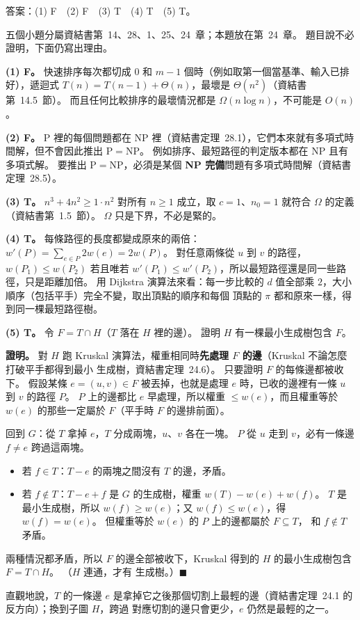 \begin{pastsoln}
答案：(1) F　(2) F　(3) T　(4) T　(5) T。

五個小題分屬資結書第~14、28、1、25、24~章；本題放在第~24~章。 題目說不必證明，下面仍寫出理由。

\textbf{(1) F。} 快速排序每次都切成 $0$ 和 $m - 1$ 個時（例如取第一個當基準、輸入已排好），遞迴式
$T(n) = T(n-1) + \Theta(n)$，最壞是 $\Theta(n^2)$（資結書第~14.5~節）。 而且任何比較排序的最壞情況都是
$\Omega(n \log n)$，不可能是 $O(n)$。

\textbf{(2) F。} P 裡的每個問題都在 NP 裡（資結書定理~28.1），它們本來就有多項式時間解，但不會因此推出
$\mathrm{P} = \mathrm{NP}$。 例如排序、最短路徑的判定版本都在 NP 且有多項式解。 要推出 $\mathrm{P} =
\mathrm{NP}$，必須是某個 \textbf{NP 完備}問題有多項式時間解（資結書定理~28.5）。

\textbf{(3) T。} $n^3 + 4n^2 \ge 1 \cdot n^2$ 對所有 $n \ge 1$ 成立，取 $c = 1$、$n_0 = 1$ 就符合 $\Omega$ 的定義
（資結書第~1.5~節）。 $\Omega$ 只是下界，不必是緊的。

\textbf{(4) T。} 每條路徑的長度都變成原來的兩倍：$w'(P) = \sum_{e \in P} 2w(e) = 2w(P)$。 對任意兩條從 $u$ 到 $v$
的路徑，$w(P_1) \le w(P_2)$ 若且唯若 $w'(P_1) \le w'(P_2)$，所以最短路徑還是同一些路徑，只是距離加倍。 用
Dijkstra 演算法來看：每一步比較的 $d$ 值全部乘 $2$，大小順序（包括平手）完全不變，取出頂點的順序和每個
頂點的 $\pi$ 都和原來一樣，得到同一棵最短路徑樹。

\textbf{(5) T。} 令 $F = T \cap H$（$T$ 落在 $H$ 裡的邊）。 證明 $H$ 有一棵最小生成樹包含 $F$。

\textbf{證明。} 對 $H$ 跑 Kruskal 演算法，權重相同時\textbf{先處理 $F$ 的邊}（Kruskal 不論怎麼打破平手都得到最小
生成樹，資結書定理~24.6）。 只要證明 $F$ 的每條邊都被收下。 假設某條 $e = (u, v) \in F$ 被丟掉，也就是處理 $e$
時，已收的邊裡有一條 $u$ 到 $v$ 的路徑 $P$。 $P$ 上的邊都比 $e$ 早處理，所以權重 $\le w(e)$，而且權重等於
$w(e)$ 的那些一定屬於 $F$（平手時 $F$ 的邊排前面）。

回到 $G$：從 $T$ 拿掉 $e$，$T$ 分成兩塊，$u$、$v$ 各在一塊。 $P$ 從 $u$ 走到 $v$，必有一條邊 $f \ne e$ 跨過這兩塊。
\begin{itemize}
\item 若 $f \in T$：$T - e$ 的兩塊之間沒有 $T$ 的邊，矛盾。
\item 若 $f \notin T$：$T - e + f$ 是 $G$ 的生成樹，權重 $w(T) - w(e) + w(f)$。 $T$ 是最小生成樹，所以
$w(f) \ge w(e)$；又 $w(f) \le w(e)$，得 $w(f) = w(e)$。 但權重等於 $w(e)$ 的 $P$ 上的邊都屬於 $F \subseteq T$，
和 $f \notin T$ 矛盾。
\end{itemize}
兩種情況都矛盾，所以 $F$ 的邊全部被收下，Kruskal 得到的 $H$ 的最小生成樹包含 $F = T \cap H$。 （$H$ 連通，才有
生成樹。）\hfill$\blacksquare$

直觀地說，$T$ 的一條邊 $e$ 是拿掉它之後那個切割上最輕的邊（資結書定理~24.1 的反方向）；換到子圖 $H$，跨過
對應切割的邊只會更少，$e$ 仍然是最輕的之一。
\end{pastsoln}
